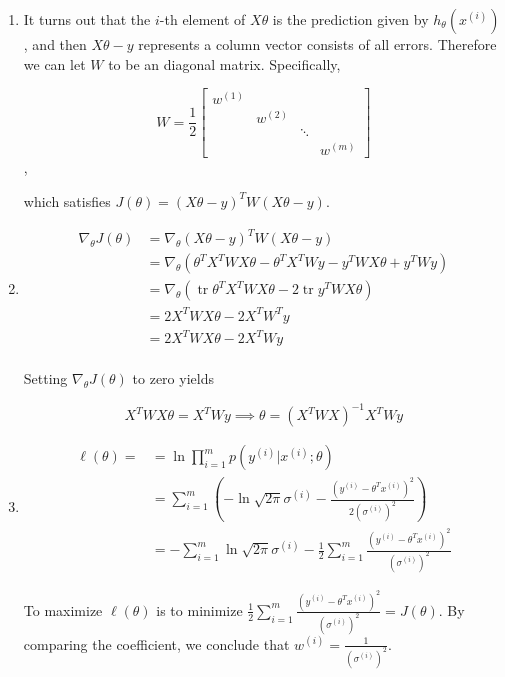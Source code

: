 \begin{answer}
	\begin{enumerate}
		\item 
		It turns out that the $i$-th element of $X\theta$ is the prediction given by $h_{\theta}(x^{(i)})$, and then $X\theta-y$ represents a column vector consists of all errors. Therefore we can let $W$ to be an diagonal matrix. Specifically,
		
		$$
		W = \frac{1}{2}\begin{bmatrix}
			w^{(1)} & & &\\
			 & w^{(2)} & &\\
			 & & \ddots & \\
			 & & & w^{(m)}
		\end{bmatrix}
		$$,
		
		which satisfies $J(\theta)=(X\theta - y)^T W (X\theta - y)$.
		
		
		
		\item
		$$
		\begin{aligned}
			\nabla_\theta J(\theta) & = \nabla_\theta (X\theta - y)^T W (X\theta - y)\\
			& = \nabla_\theta (\theta^T X^T WX\theta - \theta^T X^T Wy - y^T WX \theta + y^T W y)\\
			& = \nabla_\theta (\operatorname{tr} \theta^T X^T WX\theta - 2\operatorname{tr} y^T WX \theta)\\
			& = 2X^T WX\theta - 2X^T W^T y\\
			& = 2X^T WX\theta - 2X^T W y\\ 
		\end{aligned}
		$$
		
		Setting $\nabla_\theta J(\theta)$ to zero yields
		
		$$
		X^T WX\theta = X^T W y \implies \theta = (X^T WX)^{-1} X^T Wy
		$$
		
		
		
		\item
		$$
		\begin{aligned}
			\ell(\theta) = & = \ln \prod_{i = 1}^m p(y^{(i)} | x^{(i)}; \theta)\\
			& = \sum_{i = 1}^{m} (-\ln \sqrt{2\pi} \sigma^{(i)} - \frac{(y^{(i)} - \theta^T x^{(i)})^2}{2(\sigma^{(i)})^2})\\
			& = -\sum_{i = 1}^{m} \ln \sqrt{2\pi} \sigma^{(i)} - \frac{1}{2} \sum_{i = 1}^{m} \frac{(y^{(i)} - \theta^T x^{(i)})^2}{(\sigma^{(i)})^2}
		\end{aligned}
		$$
		
		To maximize $\ell(\theta)$ is to minimize $\frac{1}{2} \sum_{i = 1}^{m} \frac{(y^{(i)} - \theta^T x^{(i)})^2}{(\sigma^{(i)})^2} = J(\theta)$. By comparing the coefficient, we conclude that $w^{(i)} = \frac{1}{(\sigma^{(i)})^2}$.
	\end{enumerate}
\end{answer}